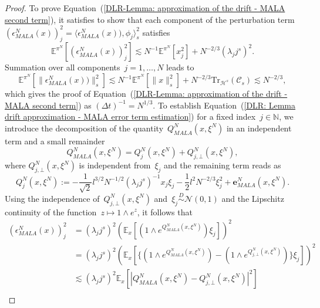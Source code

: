 \begin{proof}
 To prove Equation~(\ref{DLR-Lemma: approximation of the drift - MALA second term}), it satisfies to show that each component of the perturbation term~$ (\epsilon_{MALA}^N (x))_j^2 = \langle \epsilon_{MALA}^N (x)), \phi_j \rangle_s^2 $ satisfies
 \begin{equation}
   \label{DLR: Lemma drift approximation - MALA error term estimation}
   \mathbb{E}^{\pi^N}[(\epsilon_{MALA}^N (x))_j^2] \lesssim N^{-1} \mathbb{E}^{\pi^N}[ x_j^2 ] + N^{-2/3} (\lambda_j j^s)^2.
 \end{equation}
 Summation over all components~$j = 1, \dots, N$ leads to 
 \begin{equation*}
   \mathbb{E}^{\pi^N}[\|\epsilon_{MALA}^N (x))\|_s^2] \lesssim N^{-1} \mathbb{E}^{\pi^N}[ \|x\|_s^2 ] + N^{-2/3} \text{Tr}_{\mathcal{H}^s}(\mathcal{C}_s) \lesssim N^{-2/3},
 \end{equation*}
 which gives the proof of Equation~(\ref{DLR-Lemma: approximation of the drift - MALA second term}) as $(\Delta t)^{-1} = N^{1/3}$. To establish Equation~(\ref{DLR: Lemma drift approximation - MALA error term estimation}) for a fixed index~$j \in \mathbb{N}$, we introduce the decomposition of the quantity~$Q^N_{MALA}(x, \xi^N)$ in an independent term and a small remainder
 \begin{equation}
   \label{DLR : Lemma Drift approximation - Decomposition Q MALA}
   Q^N_{MALA}(x, \xi^N) = Q^N_j (x, \xi^N) + Q^N_{j, \bot}(x, \xi^N),
 \end{equation}
 where $Q^N_{j, \bot}(x, \xi^N)$ is independent from~$\xi_j$ and the remaining term reads as
 \begin{equation}
   Q^N_j (x, \xi^N) := - \frac{1}{\sqrt{2}} l^{3/2} N^{-1/2} (\lambda_j j^s)^{-1} x_j \xi_j - \frac{1}{2} l^2 N^{-2/3} \xi_j^2 + \textbf{e}^N_{MALA}(x, \xi^N).
 \end{equation}
 Using the independence of~$Q^N_{j, \bot}(x, \xi^N)$ and~$\xi_j \stackrel{D}{\sim} \mathcal{N}(0,1)$ and the Lipschitz continuity of the function~$z \mapsto 1 \wedge e^{z}$, it follows that
 \begin{align*}
  (\epsilon_{MALA}^N (x))_j^2 & = (\lambda_j j^s)^2 \left( \mathbb{E}_x[ (1 \wedge e^{Q^N_{MALA}(x, \xi^N)})  \xi_j] \right)^2 \\
  & = (\lambda_j j^s)^2 \left( \mathbb{E}_x[ \{ (1 \wedge e^{Q^N_{MALA}(x, \xi^N)}) - (1 \wedge e^{Q^N_{j, \bot}(x, \xi^N)}) \} \xi_j] \right)^2 \\
  & \lesssim (\lambda_j j^s)^2  \mathbb{E}_x[|Q^N_{MALA} (x, \xi^N) - Q^N_{j, \bot}(x, \xi^N)|^2] \\

\end{align*}
\end{proof}
